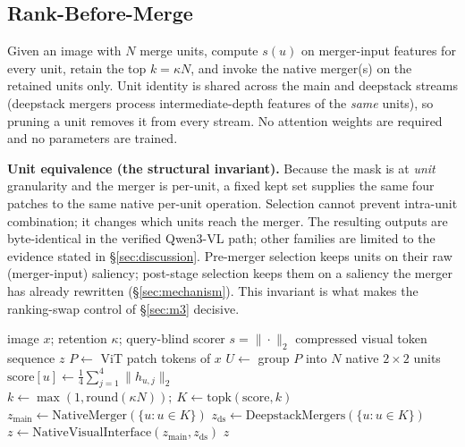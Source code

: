 \documentclass[sigconf,nonacm]{acmart}
\begin{document}
\subsection{Rank-Before-Merge}\label{sec:rbm}

Given an image with $N$ merge units, compute $s(u)$ on merger-input features for
every unit, retain the top $k = \kappa N$, and invoke the native merger(s) on
the retained units only. Unit identity is shared across the main and deepstack
streams (deepstack mergers process intermediate-depth features of the
\emph{same} units), so pruning a unit removes it from every stream. No attention
weights are required and no parameters are trained.

\textbf{Unit equivalence (the structural invariant).} Because the mask is at
\emph{unit} granularity and the merger is per-unit, a fixed kept set supplies
the same four patches to the same native per-unit operation. Selection cannot
prevent intra-unit combination; it changes which units reach the merger. The
resulting outputs are byte-identical in the verified Qwen3-VL path; other
families are limited to the evidence stated in \S\ref{sec:discussion}. Pre-merger
selection keeps units on their raw (merger-input) saliency; post-stage selection
keeps them on a saliency the merger has already rewritten (\S\ref{sec:mechanism}).
This invariant is what makes the ranking-swap control of \S\ref{sec:m3}
decisive.

\begin{algorithm}[t]
  \caption{Rank-Before-Merge (RBM), one image}
  \label{alg:rbm}
  \begin{algorithmic}[1]
    \REQUIRE image $x$; retention $\kappa$; query-blind scorer $s = \|\cdot\|_2$
    \ENSURE compressed visual token sequence $z$
    \STATE $P \gets$ ViT patch tokens of $x$ 
    \STATE $U \gets$ group $P$ into $N$ native $2\!\times\!2$ units 
    \STATE $\mathrm{score}[u] \gets \frac14\sum_{j=1}^{4}\|h_{u,j}\|_2$ 
    \ENDFOR
    \STATE $k \gets \max(1,\mathrm{round}(\kappa N));\ K \gets \mathrm{topk}(\mathrm{score},k)$
    \STATE $z_{\mathrm{main}} \gets \mathrm{NativeMerger}(\{u : u \in K\})$ 
    \STATE $z_{\mathrm{ds}} \gets \mathrm{DeepstackMergers}(\{u : u \in K\})$ 
    \STATE $z \gets \mathrm{NativeVisualInterface}(z_{\mathrm{main}}, z_{\mathrm{ds}})$
    \RETURN $z$ 
  \end{algorithmic}
\end{algorithm}
\end{document}

